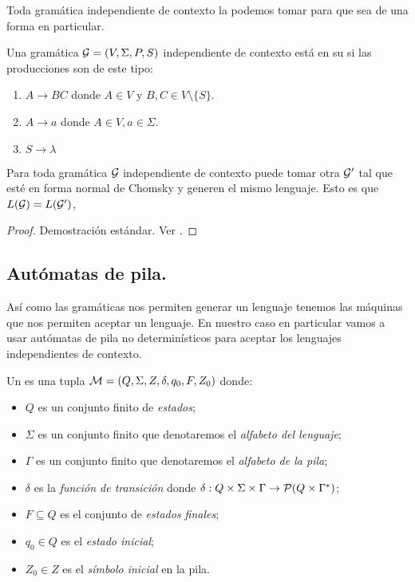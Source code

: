 \documentclass[tesis.tex]{subfiles}
\newcommand{\gramatica}{{\cal G} = (V, \Sigma, P, S)}
\newcommand{\lengderivado}{L({\cal G})}
\begin{document}
Toda gramática independiente de contexto la podemos tomar para que sea de una forma en particular.

\begin{deff}
	Una gramática $\gramatica$ independiente de contexto está en su  si las producciones son de este tipo:
	\begin{enumerate}
		\item $A \to BC$ donde $A\in V$ y $B,C \in V \setminus \{ S \}$.
		\item $A \to a$ donde $A \in V, a \in \Sigma$.
		\item $S \to \lambda$ 
	\end{enumerate}
\end{deff}

\begin{ej}
\end{ej}

\begin{prop}
	Para toda gramática $\cal G$ independiente de contexto puede tomar otra $\cal G'$ tal que esté en forma normal de Chomsky y generen el mismo lenguaje. Esto es que $\lengderivado = L(\cal G')$,
\end{prop}

\begin{proof}
	Demostración estándar. Ver \cite{hopcraft-ullman}.
\end{proof}

\subsection{Autómatas de pila.}
Así como las gramáticas nos permiten generar un lenguaje tenemos las máquinas que nos permiten aceptar un lenguaje. En nuestro caso en particular vamos a usar autómatas de pila no determinísticos para aceptar los lenguajes independientes de contexto.

\begin{deff}
	Un  es una tupla ${\cal M } = (Q, \Sigma, Z, \delta, q_0, F, Z_0)$ donde:
	\begin{itemize}
		\item $Q$ es un conjunto finito de \emph{estados};
		\item $\Sigma$ es un conjunto finito que denotaremos el \emph{alfabeto del lenguaje};
		\item $\Gamma$ es un conjunto finito que denotaremos el \emph{alfabeto de la pila};
		\item $\delta$ es la \emph{función de transición} donde $\delta: Q  \times \Sigma \times \Gamma \to {\cal P}( Q  \times \Gamma^*)$;
		\item $F \subseteq Q$ es el conjunto de \emph{estados finales};
		\item $q_0 \in Q$ es el \emph{estado inicial};
		\item $Z_0 \in Z$ es el \emph{símbolo inicial} en la pila.
	\end{itemize}
\end{deff}
\end{document}
